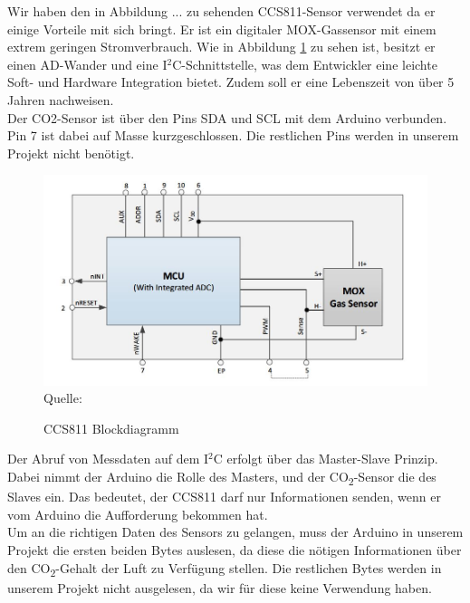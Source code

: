 \label{CCS811}

Wir haben den in Abbildung ...  zu sehenden CCS811-Sensor verwendet da er einige Vorteile mit sich bringt. Er ist ein digitaler \ac{MOX}-Gassensor mit einem extrem geringen Stromverbrauch. Wie in Abbildung \ref{fig:ccs811Blockdiagramm} zu sehen ist, besitzt er einen \ac{AD}-Wander und eine I$^2$C-Schnittstelle, was dem Entwickler eine leichte Soft- und Hardware Integration bietet. Zudem soll er eine Lebenszeit von über 5 Jahren nachweisen. \cite[vgl. S. 1]{amsAG.2016} \\


Der CO2-Sensor ist über den Pins SDA und SCL mit dem Arduino verbunden. Pin 7 ist dabei auf Masse kurzgeschlossen. Die restlichen Pins werden in unserem Projekt nicht benötigt.

\begin{figure}[!hbt]
	\centering
	\includegraphics[width=0.9\linewidth]{Images/ccs811Blockdiagramm}
	\footnotesize{Quelle: \cite[S. 3]{amsAG.2016}}
	\caption{CCS811 Blockdiagramm}
	\label{fig:ccs811Blockdiagramm}
\end{figure}

Der Abruf von Messdaten auf dem I$^2$C erfolgt über das Master-Slave Prinzip. Dabei nimmt der Arduino die Rolle des Masters, und der CO\textsubscript{2}-Sensor die des Slaves ein. Das bedeutet, der CCS811 darf nur Informationen senden, wenn er vom Arduino die Aufforderung bekommen hat. \\
Um an die richtigen Daten des Sensors zu gelangen, muss der Arduino in unserem Projekt die ersten beiden Bytes auslesen, da diese die nötigen Informationen über den CO\textsubscript{2}-Gehalt der Luft zu Verfügung stellen. Die restlichen Bytes werden in unserem Projekt nicht ausgelesen, da wir für diese keine Verwendung haben.

